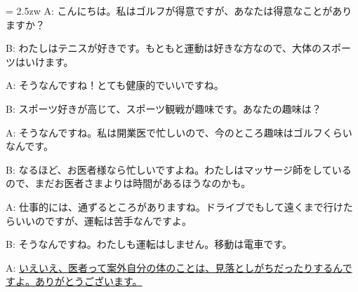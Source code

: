 \documentclass[11pt]{amsart}
\title{}
\author{}
\newenvironment{hangall}[1]{\hangindent = 2.5zw\everypar{\hangindent = 2.5zw}}{}
\begin{document}
\maketitle
\begin{hangall}{}%
A: こんにちは。私はゴルフが得意ですが、あなたは得意なことがありますか？

B: わたしはテニスが好きです。もともと運動は好きな方なので、大体のスポーツはいけます。

A: そうなんですね！とても健康的でいいですね。

B: スポーツ好きが高じて、スポーツ観戦が趣味です。あなたの趣味は？

A: そうなんですね。私は開業医で忙しいので、今のところ趣味はゴルフくらいなんです。

B: なるほど、お医者様なら忙しいですよね。わたしはマッサージ師をしているので、まだお医者さまよりは時間があるほうなのかも。

A: 仕事的には、通ずるところがありますね。ドライブでもして遠くまで行けたらいいのですが、運転は苦手なんですよ。

B: そうなんですね。わたしも運転はしません。移動は電車です。

A: \ul{いえいえ、医者って案外自分の体のことは、見落としがちだったりするんですよ。ありがとうございます。}\end{hangall}
\end{document}
